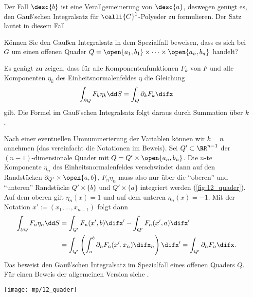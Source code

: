 \begin{antwort}
  Der Fall $\desc{b}$ ist eine Verallgemeinerung von $\desc{a}$, 
  deswegen genügt es, den Gauß'schen Integralsatz für $\calli{C}^1$-Polyeder 
  zu formulieren. Der Satz lautet in diesem Fall 

  \medskip\noindent
\end{antwort} 

\begin{frage}
  Können Sie den Gauß\sch en Integralsatz in dem Spezialfall beweisen, 
  dass es sich bei $G$ um einen offenen Quader 
  $Q=\open{a_1,b_1}\times \cdots \times \open{a_n,b_n}$ handelt?
\end{frage}

\begin{antwort}
  Es genügt zu zeigen, dass für alle Komponentenfunktionen $F_k$ 
  von $F$ und alle Komponenten $\eta_k$ des Einheitsnormalenfeldes 
  $\eta$ die Gleichung 
  \[
  \int_{\partial Q} F_k \eta_k \dd S = \int_Q \partial_k F_k \difx
  \]
  gilt. Die Formel im Gauß'schen Integralsatz folgt daraus durch 
  Summation über $k$.  

  Nach einer eventuellen Umnummerierung der Variablen können wir 
  $k=n$ annehmen (das vereinfacht die Notationen im Beweis). 
  Sei $Q'\subset \RR^{n-1}$ der $(n-1)$-dimensionale Quader mit 
  $Q= Q'\times \open{a_n,b_n}$. Die $n$-te Komponente 
  $\eta_n$ des Einheitsnormalenfeldes verschwindet 
  dann auf den Randstücken $\partial_{Q'} \times \open{a,b}$, 
  $F_n \eta_n$ muss also nur über die "`oberen"' und "`unteren"'  
  Randstücke $Q'\times \{ b \} $ und $Q'\times \{ a \}$ integriert 
  werden (\sieheAbbildung\ref{fig:12_quader}). 
  Auf dem oberen gilt $\eta_n(x)=1$ und auf dem unteren 
  $\eta_n(x)=-1$. Mit der Notation $x':=(x_1,\ldots,x_{n-1})$ folgt dann 
  \begin{align*}
    \int_{\partial Q} F_n \eta_n \dd S &= 
    \int_{Q'} F_n (x',b)  \difx' - 
    \int_{Q'} F_n( x',a ) \difx' \\
    &=
    \int_{Q'}\left(\int_a^b\partial_n F_n( x',x_n) \difx_n \right) \difx' 
    = \int_{Q'} \partial_n F_n \difx.
  \end{align*}
  Das beweist den Gauß'schen Integralsatz im Spezialfall eines offenen 
  Quaders $Q$. Für einen Beweis der allgemeinen Version siehe 
  \citep{Koenig}.\AntEnd

  \begin{center}
    \texttt{[image: mp/12\_quader]}
    \label{fig:12_quader}
  \end{center}

\end{antwort} 



